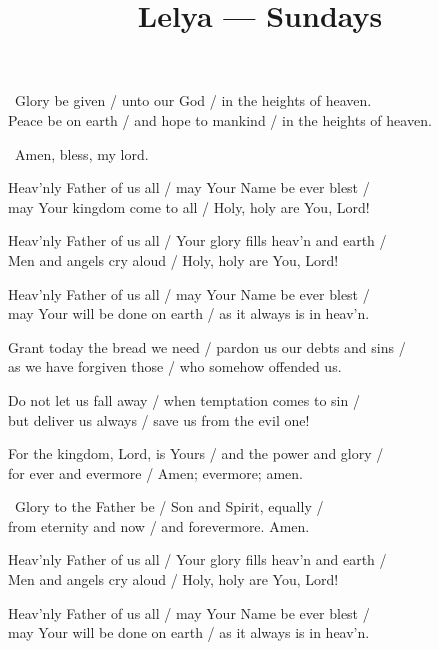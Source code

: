 \documentclass[12pt,twoside,a5paper]{article}
\begin{document}
\title{Lelya --- Sundays}
\author{}
\date{}
\maketitle


\begin{halfparskip}

  \cc~Glory be given / unto our God / in the heights of heaven.\\
  Peace be on earth / and hope to mankind / in the heights of heaven.

  \rr~Amen, bless, my lord. 

  Heav'nly Father of us all / may Your Name be ever blest / \\
  may Your kingdom come to all / Holy, holy are You, Lord!

  Heav'nly Father of us all / Your glory fills heav'n and earth / \\
  Men and angels cry aloud / Holy, holy are You, Lord!

  Heav'nly Father of us all / may Your Name be ever blest /\\
  may Your will be done on earth / as it always is in heav'n.

  Grant today the bread we need / pardon us our debts and sins /\\
  as we have forgiven those / who somehow offended us.

  Do not let us fall away / when temptation comes to sin / \\
  but deliver us always / save us from the evil one!

  For the kingdom, Lord, is Yours / and the power and glory / \\
  for ever and evermore / Amen; evermore; amen.

  \cc~Glory to the Father be / Son and Spirit, equally / \\
  from eternity and now / and forevermore. Amen.

  Heav'nly Father of us all / Your glory fills heav'n and earth / \\
  Men and angels cry aloud / Holy, holy are You, Lord!

  Heav'nly Father of us all / may Your Name be ever blest / \\
  may Your will be done on earth / as it always is in heav'n.
\end{halfparskip}
\end{document}
